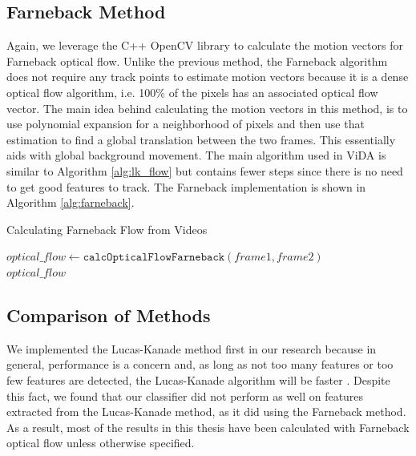 \subsection{\label{subsection:farneback_method} Farneback Method}
Again, we leverage the C++ OpenCV library to calculate the motion vectors for
Farneback optical flow. Unlike the previous method, the Farneback algorithm does not require
any track points to estimate motion vectors because it is a dense optical flow
algorithm, i.e. 100\% of the pixels has an associated optical flow vector. The
main idea behind calculating the motion vectors in this method, is to use
polynomial expansion for a neighborhood of pixels \cite{farneback2003two} and
then use that estimation to find a global translation between the two frames. This
essentially aids with global background movement. The main algorithm used in ViDA
is similar to Algorithm \ref{alg:lk_flow} but contains fewer steps since there
is no need to get good features to track. The Farneback implementation is shown
in Algorithm \ref{alg:farneback}.

\begin{algorithm}
\caption{Calculating Farneback Flow from Videos}
\label{alg:farneback}
\begin{algorithmic}[1]
  \State $optical\_flow \gets \texttt{calcOpticalFlowFarneback}(frame1, frame2)$\\
  \Return $optical\_flow$
\EndProcedure
\end{algorithmic}
\end{algorithm}

\subsection{\label{subsection:comparison}Comparison of Methods}
We implemented the Lucas-Kanade method first in our research because in general,
performance is a concern and, as long as not too many features or
too few features are detected, the Lucas-Kanade algorithm will be faster
\cite{de2015choosing}. Despite this fact, we found that our classifier did
not perform as well on features extracted from the Lucas-Kanade method, as it
did using the Farneback method. As a result, most of the results in this thesis
have been calculated with Farneback optical flow unless otherwise specified.

